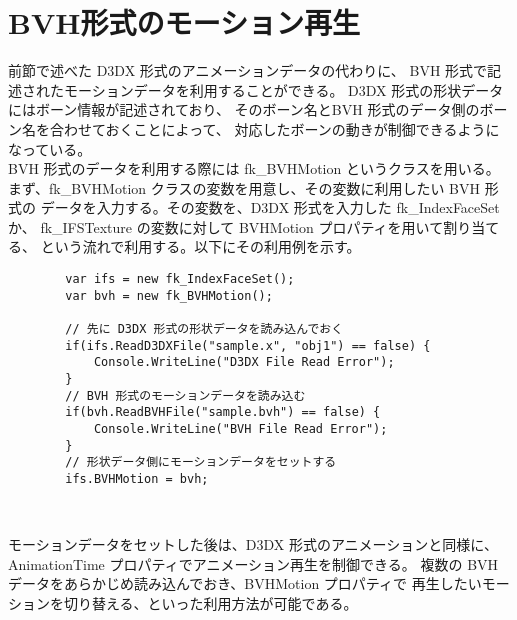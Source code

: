 \section{BVH形式のモーション再生} \label{sec:bvhmotion}
前節で述べた D3DX 形式のアニメーションデータの代わりに、
BVH 形式で記述されたモーションデータを利用することができる。
D3DX 形式の形状データにはボーン情報が記述されており、
そのボーン名とBVH 形式のデータ側のボーン名を合わせておくことによって、
対応したボーンの動きが制御できるようになっている。
\\
BVH 形式のデータを利用する際には fk\_BVHMotion というクラスを用いる。
まず、fk\_BVHMotion クラスの変数を用意し、その変数に利用したい BVH 形式の
データを入力する。その変数を、D3DX 形式を入力した fk\_IndexFaceSet か、
fk\_IFSTexture の変数に対して BVHMotion プロパティを用いて割り当てる、
という流れで利用する。以下にその利用例を示す。
\\
\begin{breakbox}
\begin{verbatim}
        var ifs = new fk_IndexFaceSet();
        var bvh = new fk_BVHMotion();
        
        // 先に D3DX 形式の形状データを読み込んでおく
        if(ifs.ReadD3DXFile("sample.x", "obj1") == false) {
            Console.WriteLine("D3DX File Read Error");
        }
        // BVH 形式のモーションデータを読み込む
        if(bvh.ReadBVHFile("sample.bvh") == false) {
            Console.WriteLine("BVH File Read Error");
        }
        // 形状データ側にモーションデータをセットする
        ifs.BVHMotion = bvh;
\end{verbatim}
\end{breakbox} ~

モーションデータをセットした後は、D3DX 形式のアニメーションと同様に、
AnimationTime プロパティでアニメーション再生を制御できる。
複数の BVH データをあらかじめ読み込んでおき、BVHMotion プロパティで
再生したいモーションを切り替える、といった利用方法が可能である。
